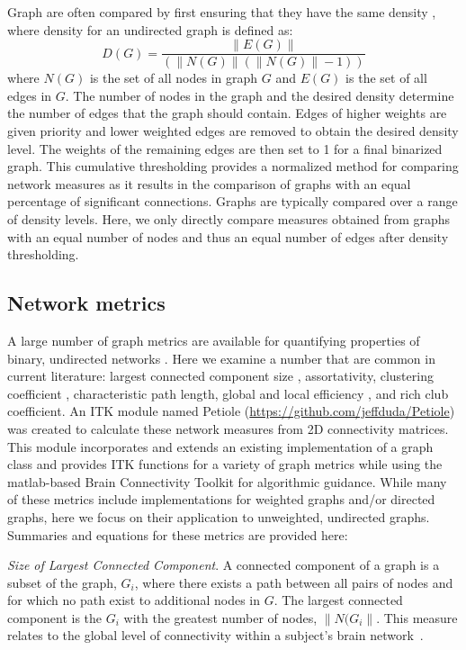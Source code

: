 \documentclass{frontiersSCNS} %
\begin{document}
Graph are often compared by first ensuring that they have the same density \citep{Achard2006,Bassett2006}, where density for an undirected graph is defined as:
$$D(G) = \frac{\|E(G)\|}{( \|N(G)\| (\|N(G)\|-1) )} $$
where $N(G)$ is the set of all nodes in graph $G$ and $E(G)$ is the set of all edges in $G$. The number of nodes in the graph and the desired density determine the number of edges that the graph should contain. Edges of higher weights are given priority and lower weighted edges are removed to obtain the desired density level. The weights of the remaining edges are then set to 1 for a final binarized graph. This cumulative thresholding provides a normalized method for comparing network measures as it results in the comparison of graphs with an equal percentage of significant connections. Graphs are typically compared over a range of density levels.  Here, we only directly compare measures obtained from graphs with an equal number of nodes and thus an equal number of edges after density thresholding.

\subsection{Network metrics}
A large number of graph metrics are available for quantifying properties of binary, undirected networks \citep{Rubinov2010}. Here we examine a number that 
are common in current literature: largest connected component size \citep{Bassett2011N}, assortativity\citep{Newman2006a,Bassett2008}, clustering coefficient \citep{Watts1998}, characteristic path length\citep{Watts1998}, global and local efficiency \citep{Latora2001}, and rich club coefficient\citep{Collin2013}. An ITK module named Petiole (\url{https://github.com/jeffduda/Petiole}) was created to calculate these network measures from 2D connectivity
matrices. This module incorporates and extends an existing implementation of a graph class \citep{Tustison2008} and provides ITK functions for a variety of graph metrics while using the matlab-based Brain Connectivity Toolkit \citep{Rubinov2010} for algorithmic guidance. While many of these metrics include implementations for weighted graphs and/or directed graphs, here we focus on their application to unweighted, undirected graphs. Summaries and equations for these metrics are provided here:

\emph{Size of Largest Connected Component}.  A connected component of a graph is a subset of the graph, $G_{i}$, where there exists a path between all pairs of nodes and for which no path exist to additional nodes in $G$. The largest connected component is the $G_{i}$ with the greatest number of nodes, $\|N(G_{i}\|$. This measure relates to the global level of connectivity within a subject's brain network~\cite{Bassett2011N}.
\end{document}
